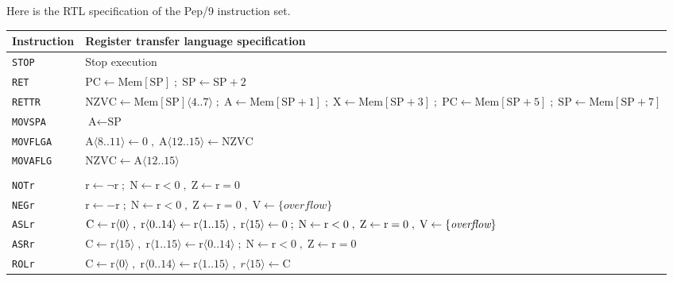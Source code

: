 \documentclass[10pt,fleqn]{book}
\begin{document}
\newpage

\noindent Here is the RTL specification of the Pep/9 instruction set.\\

\begin{tabular}{ l l }
\toprule
Instruction & Register transfer language specification\\
\midrule

\verb|STOP|    & Stop execution \\
\verb|RET|     & $\textrm{PC}\leftarrow \textrm{Mem}[\textrm{SP}]\; ; \;\textrm{SP}\leftarrow\textrm{SP}+2$ \\
\verb|RETTR|   & $\textrm{NZVC}\leftarrow\textrm{Mem}[\textrm{SP}]\langle 4..7\rangle \; ; \; \textrm{A}\leftarrow\textrm{Mem}[\textrm{SP}+1] \; ; \; \textrm{X}\leftarrow\textrm{Mem}[\textrm{SP}+3] \; ; \; \textrm{PC}\leftarrow\textrm{Mem}[\textrm{SP}+5] \; ; \; \textrm{SP}\leftarrow\textrm{Mem}[\textrm{SP}+7]$\\
\verb|MOVSPA|  & $\textrm{A}\leftarrow \textrm{SP}$\\
\verb|MOVFLGA| & $\textrm{A}\langle 8..11\rangle\leftarrow 0 \; , \; \textrm{A}\langle 12..15\rangle\leftarrow \textrm{NZVC}$\\
\verb|MOVAFLG| & $\textrm{NZVC}\leftarrow \textrm{A}\langle 12..15\rangle$\\
\\
\verb|NOTr|    & $\textrm{r}\leftarrow \neg\textrm{r}\; ; \;\textrm{N}\leftarrow\textrm{r}<0 \; , \; \textrm{Z}\leftarrow\textrm{r}=0$\\
\verb|NEGr|    & $\textrm{r}\leftarrow -\textrm{r}\; ; \;\textrm{N}\leftarrow\textrm{r}<0 \; , \; \textrm{Z}\leftarrow\textrm{r}=0 \; , \; \textrm{V}\leftarrow \{\textit{overflow}\}$\\
\verb|ASLr|    & $\textrm{C}\leftarrow \textrm{r}\langle 0\rangle \; , \; \textrm{r}\langle 0..14\rangle\leftarrow\textrm{r}\langle 1..15\rangle \; , \;\textrm{r}\langle 15\rangle\leftarrow\textrm0 \; ; \; \textrm{N}\leftarrow\textrm{r}<0 \; , \; \textrm{Z}\leftarrow\textrm{r}=0 \; , \; \textrm{V}\leftarrow \{\textit{overflow}\}$\\
\verb|ASRr|    & $\textrm{C}\leftarrow \textrm{r}\langle 15\rangle \; , \; \textrm{r}\langle 1..15\rangle\leftarrow\textrm{r}\langle 0..14\rangle \; ; \; \textrm{N}\leftarrow\textrm{r}<0 \; , \; \textrm{Z}\leftarrow\textrm{r}=0$\\
\verb|ROLr|    & $\textrm{C}\leftarrow \textrm{r}\langle 0\rangle \; , \; \textrm{r}\langle 0..14\rangle\leftarrow\textrm{r}\langle 1..15\rangle \; , \;{r}\langle 15\rangle\leftarrow \textrm{C}$\\

\end{tabular}
\end{document}
